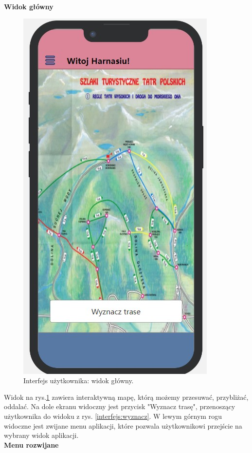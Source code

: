     \textbf{Widok główny} 
     \begin{figure}[H]
        \centering
        \includegraphics[scale=0.5]{img/interfejsy/if_główna.jpg}
        \caption{Interfejs użytkownika: widok główny.}
        \label{interfejs:glowny}
    \end{figure}
    Widok na rys.\ref{interfejs:glowny} zawiera interaktywną mapę, którą możemy przesuwać, przybliżać, oddalać. Na dole ekranu widoczny jest przycisk "Wyznacz trasę", przenoszący użytkownika do widoku z rys. \ref{interfejs:wyznacz}. W lewym górnym rogu widoczne jest zwijane menu aplikacji, które pozwala użytkownikowi przejście na wybrany widok aplikacji. \\
    \textbf{Menu rozwijane} 
